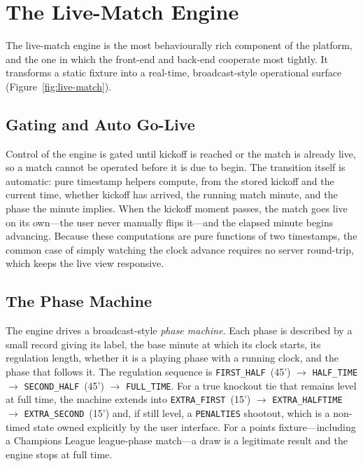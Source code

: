 \section{The Live-Match Engine}
\label{sec:res-live}

The live-match engine is the most behaviourally rich component of the platform, and the one in
which the front-end and back-end cooperate most tightly. It transforms a static fixture into a
real-time, broadcast-style operational surface (Figure~\ref{fig:live-match}).

\subsection{Gating and Auto Go-Live}
Control of the engine is gated until kickoff is reached or the match is already live, so a match
cannot be operated before it is due to begin. The transition itself is automatic: pure timestamp
helpers compute, from the stored kickoff and the current time, whether kickoff has arrived, the
running match minute, and the phase the minute implies. When the kickoff moment passes, the match
goes live on its own---the user never manually flips it---and the elapsed minute begins advancing.
Because these computations are pure functions of two timestamps, the common case of simply watching
the clock advance requires no server round-trip, which keeps the live view responsive.

\subsection{The Phase Machine}
The engine drives a broadcast-style \emph{phase machine}. Each phase is described by a small record
giving its label, the base minute at which its clock starts, its regulation length, whether it is a
playing phase with a running clock, and the phase that follows it. The regulation sequence is
\texttt{FIRST\_HALF}~(45') $\rightarrow$ \texttt{HALF\_TIME} $\rightarrow$
\texttt{SECOND\_HALF}~(45') $\rightarrow$ \texttt{FULL\_TIME}. For a true knockout tie that remains
level at full time, the machine extends into \texttt{EXTRA\_FIRST}~(15') $\rightarrow$
\texttt{EXTRA\_HALFTIME} $\rightarrow$ \texttt{EXTRA\_SECOND}~(15') and, if still level, a
\texttt{PENALTIES} shootout, which is a non-timed state owned explicitly by the user interface. For a
points fixture---including a Champions League league-phase match---a draw is a legitimate result and
the engine stops at full time.

